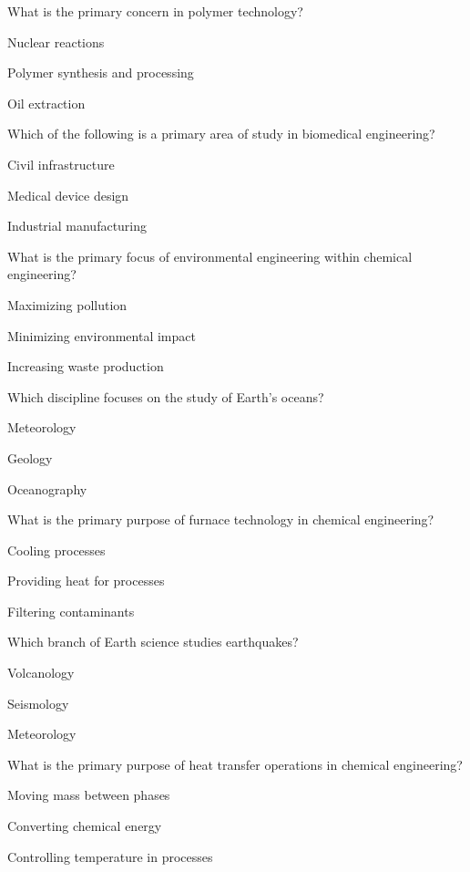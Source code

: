 \begin{enhancedmcq}{What is the primary concern in polymer technology?}
\item Nuclear reactions
\item Polymer synthesis and processing
\item Oil extraction

\end{enhancedmcq}
\begin{enhancedmcq}{Which of the following is a primary area of study in biomedical engineering?}
\item Civil infrastructure
\item Medical device design
\item Industrial manufacturing

\end{enhancedmcq}
\begin{enhancedmcq}{What is the primary focus of environmental engineering within chemical engineering?}
\item Maximizing pollution
\item Minimizing environmental impact
\item Increasing waste production

\end{enhancedmcq}
\begin{enhancedmcq}{Which discipline focuses on the study of Earth's oceans?}
\item Meteorology
\item Geology
\item Oceanography

\end{enhancedmcq}
\begin{enhancedmcq}{What is the primary purpose of furnace technology in chemical engineering?}
\item Cooling processes
\item Providing heat for processes
\item Filtering contaminants

\end{enhancedmcq}
\begin{enhancedmcq}{Which branch of Earth science studies earthquakes?}
\item Volcanology
\item Seismology
\item Meteorology

\end{enhancedmcq}
\begin{enhancedmcq}{What is the primary purpose of heat transfer operations in chemical engineering?}
\item Moving mass between phases
\item Converting chemical energy
\item Controlling temperature in processes

\end{enhancedmcq}
